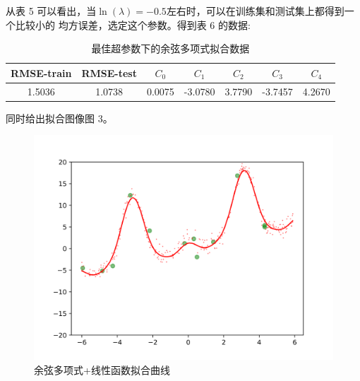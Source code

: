 \documentclass[a4paper,zihao=5,UTF8]{ctexart}
\begin{document}
    从表 5 可以看出，当$\ln(\lambda) = -0.5$左右时，可以在训练集和测试集上都得到一个比较小的
    均方误差，选定这个参数。得到表 6 的数据:
    \begin{table}[htbp]
        \centering
        \caption{最佳超参数下的余弦多项式拟合数据}
        \begin{tabular}[htbp]{ccccccc}
            \toprule
            RMSE-train & RMSE-test & $C_0$ & $C_1$ & $C_2$ & $C_3$ & $C_4$\\
            \midrule
            1.5036 & 1.0738 & 0.0075 & -3.0780 & 3.7790 & -3.7457 & 4.2670 \\
            \bottomrule
        \end{tabular}
    \end{table}
    同时给出拟合图像图 3。
    \begin{figure}[htbp]
        \centering
        \includegraphics[scale=0.8]{fit_curve_poly-cos-x.png}
        \caption{余弦多项式+线性函数拟合曲线}
    \end{figure}
    
	
\end{document}
